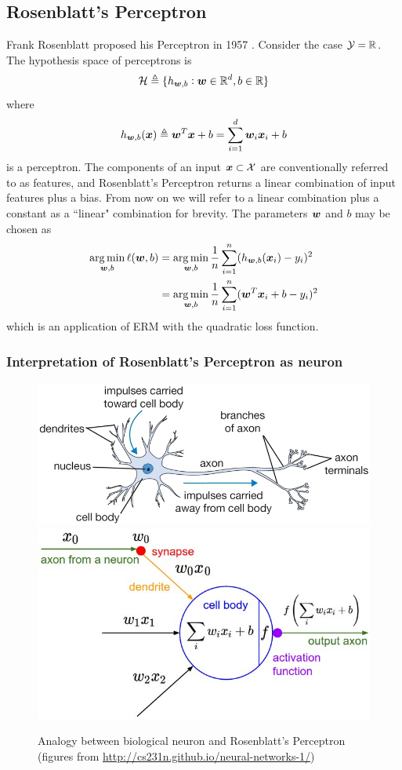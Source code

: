 \documentclass{article}
\DeclareMathOperator*{\argmin}{arg\,min}
\begin{document}
\subsection{Rosenblatt's Perceptron}

Frank Rosenblatt proposed his Perceptron in 1957 \cite{rosenblatt1958perceptron}.
Consider the case ${\mathcal Y} = {\mathbb R}$.
The hypothesis space of perceptrons is
\[
{\mathcal H} \triangleq \{h_{{\bm w}, b} : {\bm w} \in {\mathbb R}^d, b \in {\mathbb R}\}
\]
where
\[
h_{{\bm w}, b} ({\bm x})
\triangleq {\bm w}^T {\bm x} + b
= \sum_{i = 1}^d {\bm w}_i {\bm x}_i + b
\]
is a perceptron.
The components of an input ${\bm x} \subset {\mathcal X}$ are conventionally referred to as features, and Rosenblatt's Perceptron returns a linear combination of input features plus a bias.
From now on we will refer to a linear combination plus a constant as a ``linear" combination for brevity.
The parameters ${\bm w}$ and $b$ may be chosen as
\begin{align*}
\argmin_{\bmw, b} \ell (\bmw, b)
& = \argmin_{\bmw, b} \frac1n \sum_{i = 1}^n (h_{\bmw, b} (\bmx_i) - y_i)^2 \\
& = \argmin_{\bmw, b} \frac1n \sum_{i = 1}^n (\bmw^T \bmx_i + b - y_i)^2
\end{align*}
which is an application of ERM with the quadratic loss function.

\subsubsection{Interpretation of Rosenblatt's Perceptron as neuron}

\begin{figure}
\centering
\includegraphics[scale=0.2, valign=t]{neuron}
\includegraphics[scale=0.2, valign=t]{neuron_model}
\caption{Analogy between biological neuron and Rosenblatt's Perceptron (figures from \url{http://cs231n.github.io/neural-networks-1/})}
\label{perceptron}
\end{figure}
\end{document}
